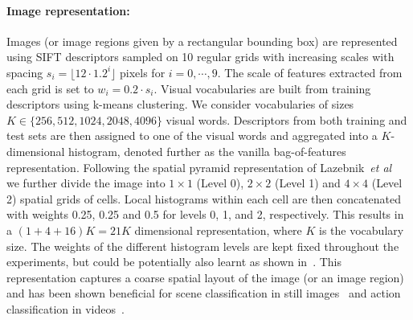 \documentclass{bmvc2k}
\def\etal{\emph{et al}\bmvaOneDot}
\newcommand{\green}[1]{#1} %
\newcommand{\parnspc}{\vspace*{-4.2mm}}
\begin{document}

\parnspc
\paragraph{Image representation:}
Images (or image regions given by a rectangular bounding box) are represented using SIFT descriptors sampled on \green{10 regular grids with increasing scales with spacing $s_i = \lfloor12 \cdot 1.2^i\rfloor$ pixels for $i = 0, \cdots, 9$. The scale of features extracted from each grid is set to $w_i = 0.2 \cdot s_i$.}
 Visual vocabularies are built from training descriptors  using k-means clustering. We consider vocabularies of sizes $K\in\{256, 512, 1024, 2048, 4096\}$ visual words. Descriptors from both training and test sets are then assigned to one of the visual words
 and aggregated into a $K$-dimensional histogram, denoted further as the vanilla bag-of-features representation.
  Following the spatial pyramid representation of Lazebnik~\etal~\cite{Lazebnik06} we further divide the image into  $1\times1$ (Level 0), $2\times2$ (Level 1) and $4\times4$ (Level 2)  spatial grids of cells. Local histograms within  each cell are then concatenated with weights 0.25, 0.25 and 0.5 for levels 0, 1, and 2, respectively. This results in a $(1 + 4 + 16)K=21K$ dimensional representation, where $K$ is the vocabulary size. The weights of the different histogram levels are kept fixed throughout the experiments, but could be potentially also learnt as shown in~\cite{Bosch07}. This representation captures a coarse spatial layout of the image (or an image region)  and has been shown beneficial for scene classification in still images~\cite{Lazebnik06} and action classification in videos~\cite{Laptev08}.

\parnspc
\end{document}
